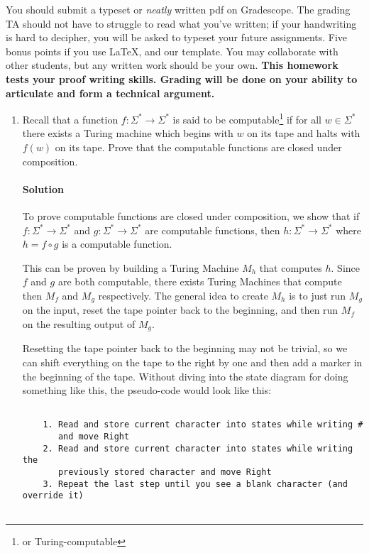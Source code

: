 \documentclass[11pt]{article}
\newcommand{\solution}[1]{\paragraph{Solution}  }
\begin{document}

You should submit a typeset or \emph{neatly} written pdf on Gradescope.  The grading TA should not have to struggle to read what you've written; if your handwriting is hard to decipher, you will be asked to typeset your future assignments. Five bonus points if you use \LaTeX, and our template. You may collaborate with other students, but any written work should be your own. \textbf{This homework tests your proof writing skills. Grading will be done on your ability to articulate and form a technical argument.}

\begin{enumerate}
    \item Recall that a function $f:\Sigma^* \rightarrow \Sigma^*$ is said to be computable\footnote{or Turing-computable} if for all $w \in \Sigma^*$ there exists a Turing machine which begins with $w$ on its tape and halts with $f(w)$ on its tape. Prove that the computable functions are closed under composition.

    \solution{} To prove computable functions are closed under composition, we show that if $f:\Sigma^* \rightarrow \Sigma^*$ and $g:\Sigma^* \rightarrow \Sigma^*$ are computable functions, then $h:\Sigma^* \rightarrow \Sigma^*$ where $h = f \circ g$ is a computable function.

    This can be proven by building a Turing Machine $M_h$ that computes $h$. Since $f$ and $g$ are both computable, there exists Turing Machines that compute then $M_f$ and $M_g$ respectively. The general idea to create $M_h$ is to just run $M_g$ on the input, reset the tape pointer back to the beginning, and then run $M_f$ on the resulting output of $M_g$. 

    Resetting the tape pointer back to the beginning may not be trivial, so we can shift everything on the tape to the right by one and then add a marker in the beginning of the tape. Without diving into the state diagram for doing something like this, the pseudo-code would look like this:

    \begin{verbatim}

    1. Read and store current character into states while writing #
       and move Right
    2. Read and store current character into states while writing the 
       previously stored character and move Right
    3. Repeat the last step until you see a blank character (and override it)
    
    \end{verbatim}


\end{enumerate}
\end{document}
